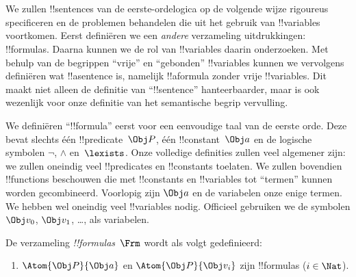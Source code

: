 \documentclass[../../../include/open-logic-section]{subfiles}
\begin{document}

\section{}

We zullen !!{sentence}s van de eerste-ordelogica op de volgende wijze
rigoureus specificeren en de problemen behandelen die uit het gebruik
van !!{variable}s voortkomen. Eerst definiëren we een \emph{andere}
verzameling uitdrukkingen: !!{formula}s. Daarna kunnen we de rol van
!!{variable}s daarin onderzoeken. Met behulp van de begrippen
``vrije'' en ``gebonden'' !!{variable}s kunnen we vervolgens definiëren
wat !!a{sentence} is, namelijk !!a{formula} zonder vrije
!!{variable}s. Dit maakt niet alleen de definitie van ``!!{sentence}''
hanteerbaarder, maar is ook wezenlijk voor onze definitie van het
semantische begrip vervulling.

We definiëren ``!!{formula}'' eerst voor een eenvoudige taal van de
eerste orde. Deze bevat slechts één !!{predicate}~$\Obj P$, één
!!{constant}~$\Obj a$ en de logische symbolen $\lnot$, $\land$
en~$\lexists$. Onze volledige definities zullen veel algemener zijn:
we zullen oneindig veel !!{predicate}s en !!{constant}s toelaten. We
zullen bovendien !!{function}s beschouwen die met !!{constant}s en
!!{variable}s tot ``termen'' kunnen worden gecombineerd. Voorlopig zijn
$\Obj a$ en de variabelen onze enige termen. We hebben wel oneindig
veel !!{variable}s nodig. Officieel gebruiken we de symbolen
$\Obj v_0$, $\Obj v_1$, \dots, als variabelen.

\begin{defn}
De verzameling \emph{!!{formula}s}~$\Frm$ wordt als volgt gedefinieerd:
\begin{enumerate}
\item{} $\Atom{\Obj P}{\Obj a}$ en $\Atom{\Obj
  P}{\Obj v_i}$ zijn !!{formula}s ($i \in \Nat$).




\end{enumerate}
\end{defn}
\end{document}
